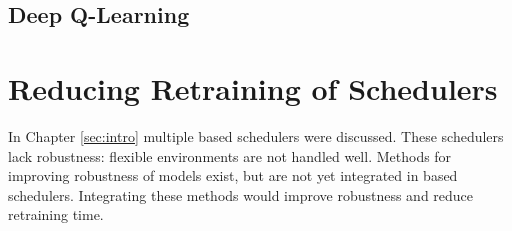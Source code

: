 \subsection{Deep Q-Learning}



\section{Reducing Retraining of Schedulers}  In Chapter
\ref{sec:intro} multiple \rl based schedulers were discussed. These schedulers
lack robustness: flexible environments are not handled well. Methods for
improving robustness of \rl models exist, but are not yet integrated in \rl
based schedulers. Integrating these methods would improve robustness and
reduce retraining time.
